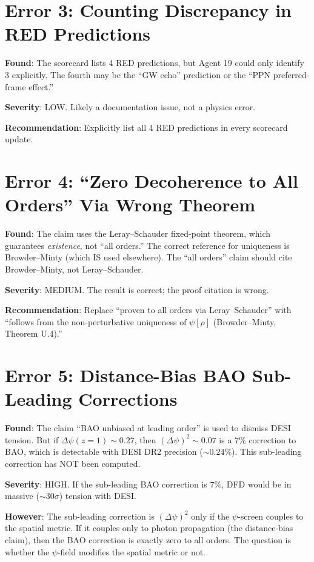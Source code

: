 \documentclass[11pt,a4paper]{article}
\begin{document}
\section{Error 3: Counting Discrepancy in RED Predictions}

\textbf{Found}: The scorecard lists 4 RED predictions, but Agent 19 could only identify 3 explicitly. The fourth may be the ``GW echo'' prediction or the ``PPN preferred-frame effect.''

\textbf{Severity}: LOW. Likely a documentation issue, not a physics error.

\textbf{Recommendation}: Explicitly list all 4 RED predictions in every scorecard update.

\section{Error 4: ``Zero Decoherence to All Orders'' Via Wrong Theorem}

\textbf{Found}: The claim uses the Leray--Schauder fixed-point theorem, which guarantees \emph{existence}, not ``all orders.'' The correct reference for uniqueness is Browder--Minty (which IS used elsewhere). The ``all orders'' claim should cite Browder--Minty, not Leray--Schauder.

\textbf{Severity}: MEDIUM. The result is correct; the proof citation is wrong.

\textbf{Recommendation}: Replace ``proven to all orders via Leray--Schauder'' with ``follows from the non-perturbative uniqueness of $\psi[\rho]$ (Browder--Minty, Theorem U.4).''

\section{Error 5: Distance-Bias BAO Sub-Leading Corrections}

\textbf{Found}: The claim ``BAO unbiased at leading order'' is used to dismiss DESI tension. But if $\Delta\psi(z=1) \sim 0.27$, then $(\Delta\psi)^2 \sim 0.07$ is a $7\%$ correction to BAO, which is detectable with DESI DR2 precision ($\sim 0.24\%$). This sub-leading correction has NOT been computed.

\textbf{Severity}: HIGH. If the sub-leading BAO correction is $7\%$, DFD would be in massive ($\sim 30\sigma$) tension with DESI.

\textbf{However}: The sub-leading correction is $(\Delta\psi)^2$ only if the $\psi$-screen couples to the spatial metric. If it couples only to photon propagation (the distance-bias claim), then the BAO correction is exactly zero to all orders. The question is whether the $\psi$-field modifies the spatial metric or not.
\end{document}
